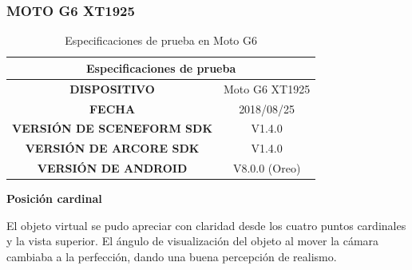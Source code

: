 \subsubsection{MOTO G6 XT1925}
\begin{table}[!h]
	\centering
	\begin{tabular}{|c|c|}
		\hline
		\multicolumn{2}{|c|}{Especificaciones de prueba}   \\ \hline
		\textbf{DISPOSITIVO}              & Moto G6 XT1925 \\ \hline
		\textbf{FECHA}                    & 2018/08/25     \\ \hline
		\textbf{VERSIÓN DE SCENEFORM SDK} & V1.4.0         \\ \hline
		\textbf{VERSIÓN DE ARCORE SDK}    & V1.4.0         \\ \hline
		\textbf{VERSIÓN DE ANDROID}       & V8.0.0 (Oreo)  \\ \hline
	\end{tabular}
	\captionsetup{justification=centering}
	\caption{Especificaciones de prueba en Moto G6}
\end{table}

\textbf{Posición cardinal} \par
El objeto virtual se pudo apreciar con claridad desde los cuatro puntos cardinales y la vista superior. El ángulo de visualización del objeto al mover la cámara cambiaba a la perfección, dando una buena percepción de realismo.

